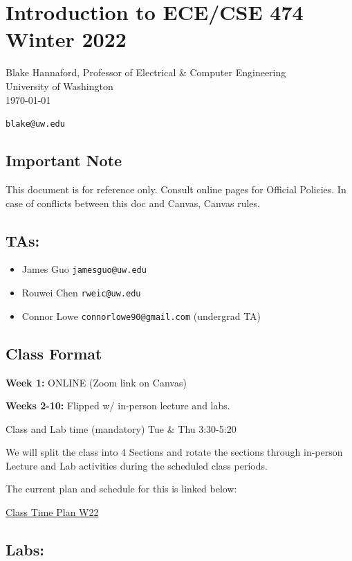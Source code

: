 \documentclass{article}	%
\begin{document}
\section{Introduction to ECE/CSE 474   Winter 2022}


Blake Hannaford, Professor of Electrical \& Computer Engineering\\
University of Washington\\
\today

{\tt blake@uw.edu}


\subsection{Important Note}
This document is for reference only. Consult online pages for Official Policies.  In case of conflicts between this doc and Canvas, Canvas rules. 



\subsection{TAs: } 
\begin{itemize}
    \item James Guo {\tt jamesguo@uw.edu}
    \item Rouwei Chen {\tt rweic@uw.edu}
    \item Connor Lowe {\tt connorlowe90@gmail.com} (undergrad TA)
\end{itemize}



\subsection{Class Format } 
{\bf Week 1: } ONLINE (Zoom link on Canvas)

\noindent
{\bf Weeks 2-10: }  Flipped w/ in-person lecture and labs.

Class and Lab time (mandatory)
Tue \& Thu 3:30-5:20 

We will split the class into 4 Sections and rotate the sections through in-person Lecture and Lab activities 
during the scheduled class periods. 

The current plan and schedule for this is linked below:

\href{https://docs.google.com/document/d/1A8oC3ewd6Q8TIoT6QboHHqFP_86O5W6CQmI3ssmzw74/edit}{Class Time Plan W22}


\subsection{Labs: }
\end{document}
